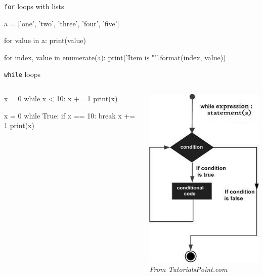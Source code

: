 \begin{frame}[fragile]{\texttt{for} loops with lists}
    \begin{py3}
        a = ['one', 'two', 'three', 'four', 'five']

        for value in a:
            print(value)

        for index, value in enumerate(a):
            print('Item {} is "{}"'.format(index, value))
    \end{py3}
\end{frame}

\begin{frame}[fragile]{\texttt{while} loops}
    \begin{columns}
        \begin{column}{0.5\textwidth}
            \vspace{1.5em}
            \begin{py3}
                x = 0
                while x < 10:
                    x += 1
                    print(x)
            \end{py3}
            \vspace{0.5em}
            \begin{py3}
                x = 0
                while True:
                    if x == 10:
                        break
                    x += 1
                    print(x)
            \end{py3}
        \end{column}
        \begin{column}{0.5\textwidth}
            \begin{center}
                \includegraphics[height=0.75\textheight]{figures/while_loop} \\
                {\scriptsize\em%
                 From \textit{TutorialsPoint.com}}
            \end{center}
        \end{column}
    \end{columns}
\end{frame}

